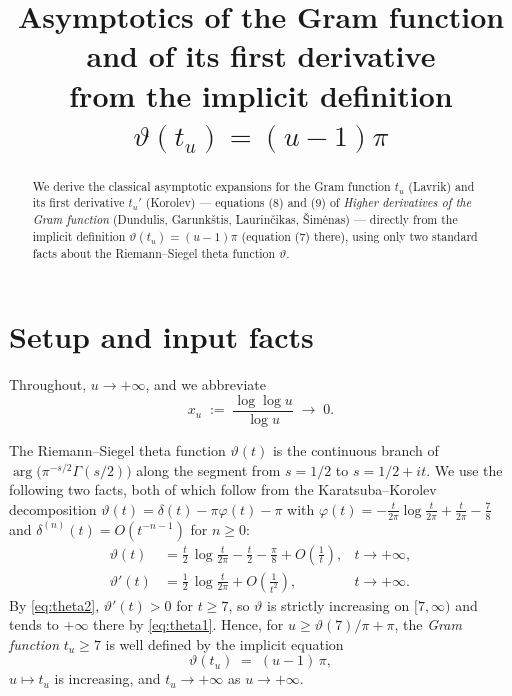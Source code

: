 \documentclass[11pt]{article}
\title{Asymptotics of the Gram function and of its first derivative\\
  from the implicit definition $\vartheta(t_u)=(u-1)\pi$}
\author{}
\date{}
\theoremstyle{remark}
\begin{document}
\maketitle

\begin{abstract}
  We derive the classical asymptotic expansions for the Gram function
  $t_u$ (Lavrik) and its first derivative $t_u'$ (Korolev) --- equations
  (8) and (9) of \emph{Higher derivatives of the Gram function}
  (Dundulis, Garunk\v{s}tis, Laurin\v{c}ikas, \v{S}im\.{e}nas) --- directly
  from the implicit definition $\vartheta(t_u) = (u-1)\pi$ (equation (7)
  there), using only two standard facts about the Riemann--Siegel theta
  function $\vartheta$.
\end{abstract}

\section{Setup and input facts}

Throughout, $u \to +\infty$, and we abbreviate
\[
  x_u \;:=\; \frac{\log\log u}{\log u} \;\longrightarrow\; 0 .
\]

The Riemann--Siegel theta function $\vartheta(t)$ is the continuous branch
of $\arg\bigl(\pi^{-s/2}\Gamma(s/2)\bigr)$ along the segment from
$s = 1/2$ to $s = 1/2 + it$. We use the following two facts, both of
which follow from the Karatsuba--Korolev decomposition
$\vartheta(t) = \delta(t) - \pi\varphi(t) - \pi$ with
$\varphi(t) = -\tfrac{t}{2\pi}\log\tfrac{t}{2\pi} + \tfrac{t}{2\pi} -
\tfrac{7}{8}$ and $\delta^{(n)}(t) = O(t^{-n-1})$ for $n \ge 0$:
\begin{align}
  \vartheta(t)  &= \frac{t}{2}\,\log\frac{t}{2\pi} - \frac{t}{2}
                  - \frac{\pi}{8} + O\!\left(\frac{1}{t}\right),
                  & t \to +\infty, \tag{$\vartheta$1}\label{eq:theta1}\\[2pt]
  \vartheta'(t) &= \frac{1}{2}\,\log\frac{t}{2\pi}
                  + O\!\left(\frac{1}{t^{2}}\right),
                  & t \to +\infty. \tag{$\vartheta$2}\label{eq:theta2}
\end{align}
By \eqref{eq:theta2}, $\vartheta'(t) > 0$ for $t \ge 7$, so $\vartheta$
is strictly increasing on $[7,\infty)$ and tends to $+\infty$ there by
\eqref{eq:theta1}. Hence, for $u \ge \vartheta(7)/\pi + \pi$, the
\emph{Gram function} $t_u \ge 7$ is well defined by the implicit
equation
\begin{equation}
  \vartheta(t_u) \;=\; (u-1)\,\pi, \tag{7}\label{eq:seven}
\end{equation}
$u \mapsto t_u$ is increasing, and $t_u \to +\infty$ as $u \to +\infty$.
\end{document}
